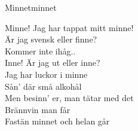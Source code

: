 \begin{song}{Minnet}{minnet}
\begin{vers}
Minne! Jag har tappat mitt minne!\\
Är jag svensk eller finne?\\
Kommer inte ihåg..\\
Inne! Är jag ut eller inne?\\
Jag har luckor i minne\\
Sån' där små alkohål\\
Men besinn' er, man tätar med det\\
Brännvin man får\\
Fastän minnet och helan går\\
\end{vers}
\end{song}
